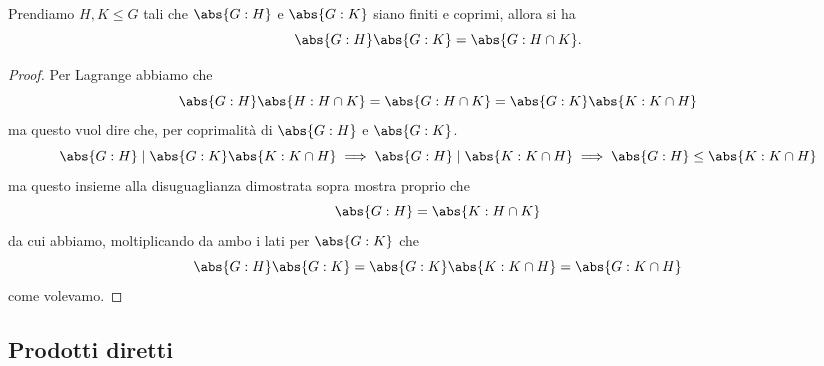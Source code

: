 \documentclass[11pt]{scrartcl}
\begin{document}
	\begin{proposition}
		Prendiamo $H,K\le G$ tali che $\abs{G:H}$ e $\abs{G:K}$ siano finiti e coprimi, allora si ha
		$$\abs{G:H}\abs{G:K}=\abs{G:H\cap K}.$$
	\end{proposition}
	\begin{proof}
		Per Lagrange abbiamo che
		$$\abs{G:H}\abs{H:H\cap K}=\abs{G:H\cap K}=\abs{G:K}\abs{K:K\cap H}$$
		ma questo vuol dire che, per coprimalità di $\abs{G:H}$ e $\abs{G:K}$.
		$$\abs{G:H}\mid \abs{G:K}\abs{K:K\cap H} \implies \abs{G:H}\mid \abs{K:K\cap H} \implies \abs{G:H}\le \abs{K:K\cap H}$$
		ma questo insieme alla disuguaglianza dimostrata sopra mostra proprio che 
		$$\abs{G:H}=\abs{K:H\cap K}$$
		da cui abbiamo, moltiplicando da ambo i lati per $\abs{G:K}$ che
		$$\abs{G:H}\abs{G:K}=\abs{G:K}\abs{K:K\cap H}=\abs{G:K\cap H}$$
		come volevamo.
	\end{proof}
	
	\subsection{Prodotti diretti}
	
\end{document}
